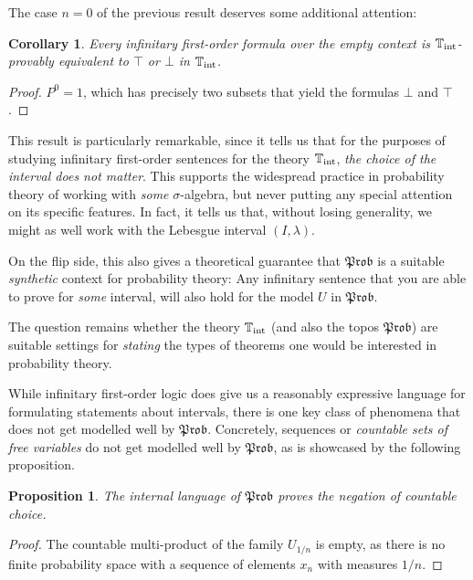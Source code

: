 \documentclass[a4paper]{amsproc}
\theoremstyle{plain}
\newtheorem{proposition}[theorem]{Proposition}
\newtheorem{corollary}[theorem]{Corollary}
\theoremstyle{definition}
\theoremstyle{remark}
\numberwithin{equation}{section}
\newcommand{\Prob}{\mathfrak{Prob}}
\begin{document}
The case $n = 0$ of the previous result deserves some additional attention:

\begin{corollary}
    Every infinitary first-order formula over the empty context is $\mathbb{T}_{\textup{int}}$-provably equivalent to $\top$ or $\bot$ in $\mathbb{T}_{\textup{int}}$.
\end{corollary}

\begin{proof}
    $P^0 = 1$, which has precisely two subsets that yield the formulas $\bot$ and $\top$.
\end{proof}

This result is particularly remarkable, since it tells us that for the purposes of studying infinitary first-order sentences for the theory $\mathbb{T}_{\textup{int}}$, \emph{the choice of the interval does not matter}. This supports the widespread practice in probability theory of working with \emph{some} $\sigma$-algebra, but never putting any special attention on its specific features. In fact, it tells us that, without losing generality, we might as well work with the Lebesgue interval $(I,\lambda)$.

On the flip side, this also gives a theoretical guarantee that $\Prob$ is a suitable \emph{synthetic} context for probability theory: Any infinitary sentence that you are able to prove for \emph{some} interval, will also hold for the model $U$ in $\Prob$.

The question remains whether the theory $\mathbb{T}_{\textup{int}}$ (and also the topos $\Prob$) are suitable settings for \emph{stating} the types of theorems one would be interested in probability theory.

While infinitary first-order logic does give us a reasonably expressive language for formulating statements about intervals, there is one key class of phenomena that does not get modelled well by $\Prob$. Concretely, sequences or \emph{countable sets of free variables} do not get modelled well by $\Prob$, as is showcased by the following proposition.

\begin{proposition}\label{choice_failture}
    The internal language of $\Prob$ proves the negation of countable choice.
\end{proposition}
\begin{proof}
    The countable multi-product of the family $U_{1/n}$ is empty, as there is no finite probability space with a sequence of elements $x_n$ with measures $1/n$.
\end{proof}
\end{document}

